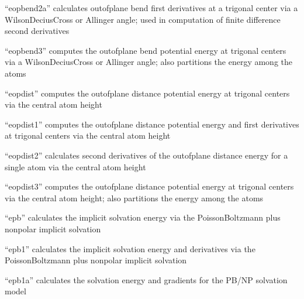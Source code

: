 \documentclass[letterpaper,11pt,english]{sphinxmanual}
\begin{document}

“eopbend2a” calculates out\sphinxhyphen{}of\sphinxhyphen{}plane bend first derivatives at
a trigonal center via a Wilson\sphinxhyphen{}Decius\sphinxhyphen{}Cross or Allinger angle;
used in computation of finite difference second derivatives


“eopbend3” computes the out\sphinxhyphen{}of\sphinxhyphen{}plane bend potential energy at
trigonal centers via a Wilson\sphinxhyphen{}Decius\sphinxhyphen{}Cross or Allinger angle;
also partitions the energy among the atoms


“eopdist” computes the out\sphinxhyphen{}of\sphinxhyphen{}plane distance potential
energy at trigonal centers via the central atom height


“eopdist1” computes the out\sphinxhyphen{}of\sphinxhyphen{}plane distance potential
energy and first derivatives at trigonal centers via
the central atom height


“eopdist2” calculates second derivatives of the out\sphinxhyphen{}of\sphinxhyphen{}plane
distance energy for a single atom via the central atom height


“eopdist3” computes the out\sphinxhyphen{}of\sphinxhyphen{}plane distance potential energy
at trigonal centers via the central atom height; also partitions
the energy among the atoms


“epb” calculates the implicit solvation energy via the
Poisson\sphinxhyphen{}Boltzmann plus nonpolar implicit solvation


“epb1” calculates the implicit solvation energy and derivatives
via the Poisson\sphinxhyphen{}Boltzmann plus nonpolar implicit solvation


“epb1a” calculates the solvation energy and gradients for the
PB/NP solvation model

\end{document}
